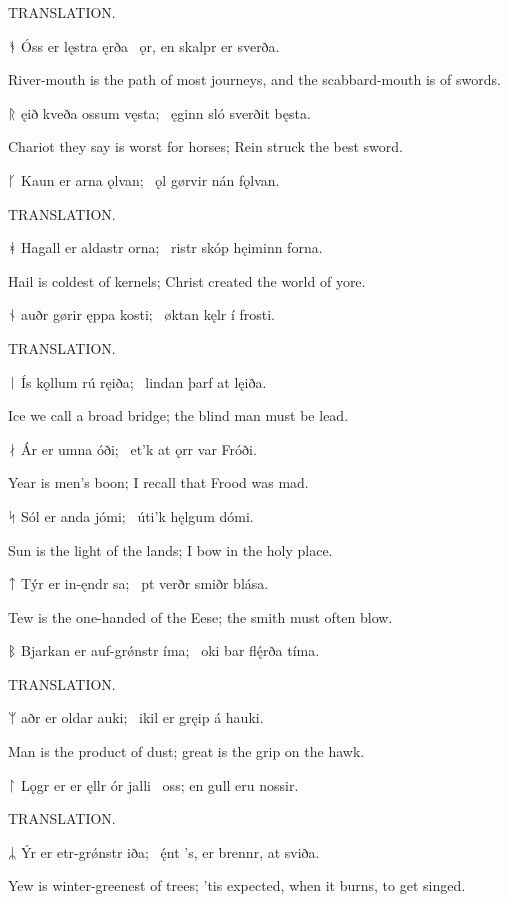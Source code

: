 \bvb TRANSLATION.\evb\evg


\bvg\bva ᚬ Óss er lęstra ęrða \hld\ ǫr, en skalpr er sverða.\eva

\bvb River-mouth is the path of most journeys, and the scabbard-mouth is of swords.\evb\evg


\bvg\bva ᚱ ęið kveða ossum vęsta; \hld\ ęginn sló sverðit bęsta.\eva

\bvb Chariot they say is worst for horses; Rein struck the best sword.\evb\evg


\bvg\bva ᚴ Kaun er arna ǫlvan; \hld\ ǫl gørvir nán fǫlvan.\eva

\bvb TRANSLATION.\evb\evg


\bvg\bva ᚼ Hagall er aldastr orna; \hld\ ristr skóp hęiminn forna.\eva

\bvb Hail is coldest of kernels; Christ created the world of yore.\evb\evg


\bvg\bva ᚾ auðr gørir ęppa kosti; \hld\ øktan kęlr í frosti.\eva

\bvb TRANSLATION.\evb\evg


\bvg\bva ᛁ Ís kǫllum rú ręiða; \hld\ lindan þarf at lęiða.\eva

\bvb Ice we call a broad bridge; the blind man must be lead.\evb\evg


\bvg\bva ᛅ Ár er umna óði; \hld\ et’k at ǫrr var Fróði.\eva

\bvb Year is men’s boon; I recall that Frood was mad.\evb\evg


\bvg\bva ᛋ Sól er anda jómi; \hld\ úti’k hęlgum dómi.\eva

\bvb Sun is the light of the lands; I bow in the holy place.\evb\evg


\bvg\bva ᛏ Týr er in-ęndr sa; \hld\ pt verðr smiðr blása.\eva

\bvb Tew is the one-handed of the Eese; the smith must often blow.\evb\evg


\bvg\bva ᛒ Bjarkan er auf-grǿnstr íma; \hld\ oki bar flę́rða tíma.\eva

\bvb TRANSLATION.\evb\evg


\bvg\bva ᛘ aðr er oldar auki; \hld\ ikil er gręip á hauki.\eva

\bvb Man is the product of dust; great is the grip on the hawk.\evb\evg


\bvg\bva ᛚ Lǫgr er er ęllr ór jalli \hld\ oss; en gull eru nossir.\eva

\bvb TRANSLATION.\evb\evg


\bvg\bva ᛦ Ýr er etr-grǿnstr iða; \hld\ ę́nt ’s, er brennr, at sviða. \eva

\bvb Yew is winter-greenest of trees; ’tis expected, when it burns, to get singed.\evb\evg

\sectionline
